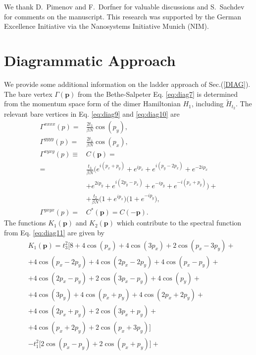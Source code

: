 \documentclass[aps,pra,reprint,showpacs,superscriptaddress]{revtex4-1}
\newcommand\bs[1]{\ensuremath{\boldsymbol{#1}}}
\begin{document}
\acknowledgements

We thank D.~Pimenov and F.~Dorfner for valuable discussions and S.~Sachdev for comments on the manuscript. This research was supported by the German Excellence Initiative via the Nanosystems Initiative Munich (NIM).

\appendix


\section{Diagrammatic Approach}

We provide some additional information on the ladder approach of Sec.(\ref{DIAG}). The bare vertex $\Gamma (\bs{p})$ from the Bethe-Salpeter Eq. \eqref{eq:diag7} is determined from the momentum space form of the dimer Hamiltonian $H_1$, including $\tilde{H}_{t_2}$. The relevant bare vertices in Eq. \eqref{eq:diag9} and \eqref{eq:diag10} are
\begin{align}
\Gamma^{xxxx}(p)=&\frac{2t_1}{\beta N}\cos(p_y), \label{eq:Adiag1}\\
\Gamma^{yyyy}(p)=&\frac{2t_1}{\beta N}\cos(p_x), \\
\Gamma^{xyxy}(p)\equiv &C(\bs{p})= \\
=&\frac{t_3}{\beta N}\bigl( e^{i(p_x+p_y)}+e^{ip_x}+e^{i(p_y-2p_x)}+e^{-2ip_x} \nonumber\\
&+e^{2ip_y}+e^{i(2p_y-p_x)}+e^{-ip_y}+e^{-i(p_x+p_y)}\bigr)+ \nonumber\\
&+\frac{t_2}{\beta N}\bigl(1+e^{ip_x}\bigr)\bigl(1+e^{-ip_y}\bigr), \nonumber\\ 
\Gamma^{yxyx}(p)=&C^*(\bs{p})=C(-\bs{p}).
\end{align}
The functions $K_1(\bs{p})$ and $K_2(\bs{p})$ which contribute to the spectral function from Eq. \eqref{eq:diag11} are given by
\begin{align}
&K_1(\bs{p})=t_3^2\biggl[8+4\cos (p_x)+4\cos (3p_x)+2\cos (p_x-3p_y)+ \label{eq:Adiag2}\\
&+4\cos (p_x-2p_y)+4\cos (2p_x-2p_y)+4\cos (p_x-p_y)+ \nonumber\\
&+4\cos (2p_x-p_y)+2\cos (3p_x-p_y)+4\cos (p_y)+ \nonumber\\
&+4\cos (3p_y)+4\cos (p_x+p_y)+4\cos (2p_x+2p_y)+ \nonumber\\
&+4\cos (2p_x+p_y)+2\cos (3p_x+p_y)+ \nonumber\\
&+4\cos (p_x+2p_y)+2\cos (p_x+3p_y)\biggr] \nonumber\\
&-t_1^2\biggl[2\cos (p_x-p_y)+2\cos (p_x+p_y)\biggr]+ \nonumber
\end{align}
\end{document}
